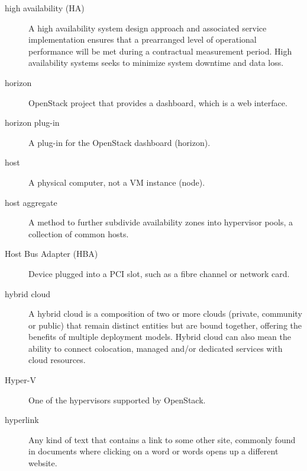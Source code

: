\documentclass[letterpaper,10pt,english]{sphinxmanual}
\begin{document}
\begin{description}
\item[{high availability (HA)}] \leavevmode{}\label{_source/glossary:term-high-availability-ha}
A high availability system design approach and associated
service implementation ensures that a prearranged level of
operational performance will be met during a contractual
measurement period. High availability systems seeks to
minimize system downtime and data loss.

\item[{horizon}] \leavevmode{}\label{_source/glossary:term-horizon}
OpenStack project that provides a dashboard, which is a web
interface.

\item[{horizon plug-in}] \leavevmode{}\label{_source/glossary:term-horizon-plug-in}
A plug-in for the OpenStack dashboard (horizon).

\item[{host}] \leavevmode{}\label{_source/glossary:term-host}
A physical computer, not a VM instance (node).

\item[{host aggregate}] \leavevmode{}\label{_source/glossary:term-host-aggregate}
A method to further subdivide availability zones into hypervisor
pools, a collection of common hosts.

\item[{Host Bus Adapter (HBA)}] \leavevmode{}\label{_source/glossary:term-host-bus-adapter-hba}
Device plugged into a PCI slot, such as a fibre channel or
network card.

\item[{hybrid cloud}] \leavevmode{}\label{_source/glossary:term-hybrid-cloud}
A hybrid cloud is a composition of two or more clouds
(private, community or public) that remain distinct entities
but are bound together, offering the benefits of multiple
deployment models.  Hybrid cloud can also mean the ability
to connect colocation, managed and/or dedicated services
with cloud resources.

\item[{Hyper-V}] \leavevmode{}\label{_source/glossary:term-hyper-v}
One of the hypervisors supported by OpenStack.

\item[{hyperlink}] \leavevmode{}\label{_source/glossary:term-hyperlink}
Any kind of text that contains a link to some other site,
commonly found in documents where clicking on a word or words opens up
a different website.


\end{description}
\end{document}
